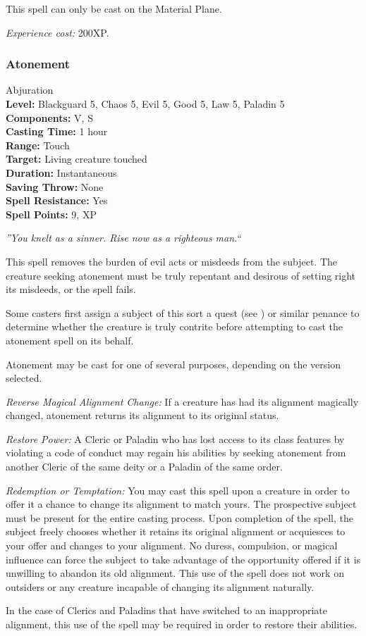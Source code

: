 This spell can only be cast on the Material Plane.

\emph{Experience cost:} 200XP.

\subsubsection{Atonement}
\label{Spell:Atonement}
Abjuration
\\ \textbf{Level:} Blackguard 5, Chaos 5, Evil 5, Good 5, Law 5, Paladin 5
\\ \textbf{Components:} V, S
\\ \textbf{Casting Time:} 1 hour
\\ \textbf{Range:} Touch
\\ \textbf{Target:} Living creature touched
\\ \textbf{Duration:} Instantaneous
\\ \textbf{Saving Throw:} None
\\ \textbf{Spell Resistance:} Yes
\\ \textbf{Spell Points:} 9, XP

\emph{''You knelt as a sinner. Rise now as a righteous man.``}

This spell removes the burden of evil acts or misdeeds from the subject. 
The creature seeking atonement must be truly repentant and desirous of setting right its misdeeds, or the spell fails.

Some casters first assign a subject of this sort a quest (see ) or similar penance to determine whether the creature is truly contrite 
before attempting to cast the atonement spell on its behalf.

Atonement may be cast for one of several purposes, depending on the version selected.
\begin{list}{}{\leftmargin=1em}
\item \emph{Reverse Magical Alignment Change:}
If a creature has had its alignment magically changed, atonement returns its alignment to its original status.
\item \emph{Restore Power:}
A Cleric or Paladin who has lost access to its class features by violating a code of conduct may regain his abilities by seeking atonement 
from another Cleric of the same deity or a Paladin of the same order.
\item \emph{Redemption or Temptation:}
You may cast this spell upon a creature in order to offer it a chance to change its alignment to match yours. 
The prospective subject must be present for the entire casting process. Upon completion of the spell, 
the subject freely chooses whether it retains its original alignment or acquiesces to your offer and changes to your alignment. 
No duress, compulsion, or magical influence can force the subject to take advantage of the opportunity offered if it is unwilling to abandon its old alignment. 
This use of the spell does not work on outsiders or any creature incapable of changing its alignment naturally.

In the case of Clerics and Paladins that have switched to an inappropriate alignment, this use of the spell may be required in order to restore their abilities.
\end{list}

